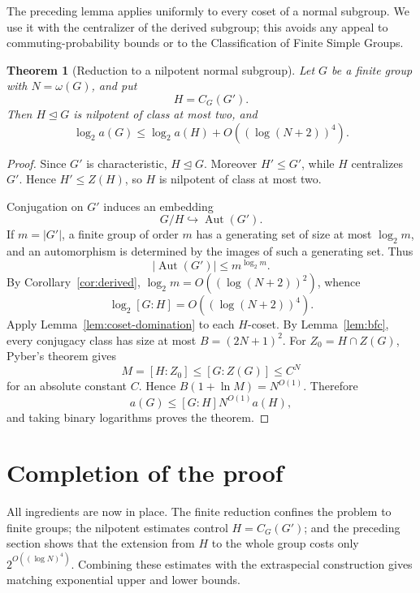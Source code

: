 \documentclass[11pt]{article}
\newtheorem{theorem}{Theorem}[section]
\theoremstyle{definition}
\theoremstyle{remark}
\newcommand{\Aut}{\operatorname{Aut}}
\begin{document}
The preceding lemma applies uniformly to every coset of a normal subgroup. We use it with the centralizer of the derived subgroup; this avoids any appeal to commuting-probability bounds or to the Classification of Finite Simple Groups.

\begin{theorem}[Reduction to a nilpotent normal subgroup]\label{thm:reduction}
Let $G$ be a finite group with $N=\omega(G)$, and put
\[
H=C_G(G').
\]
Then $H\trianglelefteq G$ is nilpotent of class at most two, and
\[
\log_2a(G)\le\log_2a(H)+O\!\left((\log(N+2))^4\right).
\]
\end{theorem}

\begin{proof}
Since $G'$ is characteristic, $H\trianglelefteq G$. Moreover $H'\le G'$, while $H$ centralizes $G'$. Hence $H'\le Z(H)$, so $H$ is nilpotent of class at most two.

Conjugation on $G'$ induces an embedding
\[
G/H\hookrightarrow\Aut(G').
\]
If $m=|G'|$, a finite group of order $m$ has a generating set of size at most $\log_2m$, and an automorphism is determined by the images of such a generating set. Thus
\[
|\Aut(G')|\le m^{\log_2m}.
\]
By Corollary~\ref{cor:derived}, $\log_2m=O((\log(N+2))^2)$, whence
\[
\log_2[G:H]=O((\log(N+2))^4).
\]
Apply Lemma~\ref{lem:coset-domination} to each $H$-coset. By Lemma~\ref{lem:bfc}, every conjugacy class has size at most $B=(2N+1)^2$. For $Z_0=H\cap Z(G)$, Pyber's theorem \cite{Pyber1987} gives
\[
M=[H:Z_0]\le[G:Z(G)]\le C^N
\]
for an absolute constant $C$. Hence $B(1+\ln M)=N^{O(1)}$. Therefore
\[
a(G)\le[G:H]N^{O(1)}a(H),
\]
and taking binary logarithms proves the theorem.
\end{proof}

\section{Completion of the proof}

All ingredients are now in place. The finite reduction confines the problem to finite groups; the nilpotent estimates control $H=C_G(G')$; and the preceding section shows that the extension from $H$ to the whole group costs only $2^{O((\log N)^4)}$. Combining these estimates with the extraspecial construction gives matching exponential upper and lower bounds.
\end{document}
